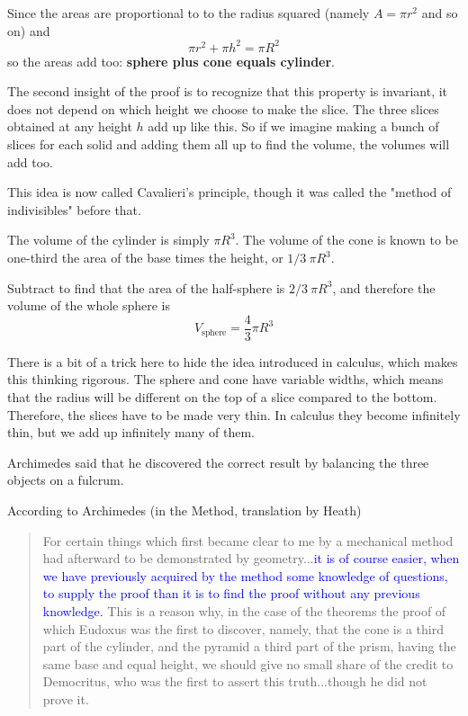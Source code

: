 \documentclass[11pt, oneside]{article}
\begin{document}
Since the areas are proportional to to the radius squared (namely $A = \pi r^2$ and so on) and
\[ \pi r^2 + \pi h^2 = \pi R^2 \]
so the areas add too:  \textbf{sphere plus cone equals cylinder}.

The second insight of the proof is to recognize that this property is invariant, it does not depend on which height we choose to make the slice.  The three slices obtained at any height $h$ add up like this.  So if we imagine making a bunch of slices for each solid and adding them all up to find the volume, the volumes will add too.

This idea is now called Cavalieri's principle, though it was called the "method of indivisibles" before that.

The volume of the cylinder is simply $\pi R^3$.  The volume of the cone is known to be one-third the area of the base times the height, or $1/3 \ \pi R^3$.

Subtract to find that the area of the half-sphere is $2/3 \ \pi R^3$, and therefore the volume of the whole sphere is
\[ V_{\text{sphere}} = \frac{4}{3} \pi R^3 \]

There is a bit of a trick here to hide the idea introduced in calculus, which makes this thinking rigorous.  The sphere and cone have variable widths, which means that the radius will be different on the top of a slice compared to the bottom.  Therefore, the slices have to be made very thin.  In calculus they become infinitely thin, but we add up infinitely many of them.

Archimedes said that he discovered the correct result by balancing the three objects on a fulcrum.  

According to Archimedes (in the Method, translation by Heath)

\begin{quote}For certain things which first became clear to me by a mechanical method had afterward to be demonstrated by geometry...\textcolor{blue}{it is of course easier, when we have previously acquired by the method some knowledge of questions, to supply the proof than it is to find the proof without any previous knowledge.} This is a reason why, in the case of the theorems the proof of which Eudoxus was the first to discover, namely, that the cone is a third part of the cylinder, and the pyramid a third part of the prism, having the same base and equal height, we should give no small share of the credit to Democritus, who was the first to assert this truth...though he did not prove it.
\end{quote}
\end{document}
